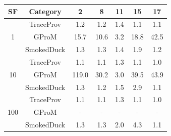 \begin{tabular}{|c|c|c|c|c|c|c|}
\hline
SF & Category & 2 & 8 & 11 & 15 & 17 \\  
 \hline 
 \multirow{3}{*}{1} & TraceProv & 1.2 & 1.2 & 1.4 & 1.1 & 1.1 \\  
 \cline{2-7} 
  & GProM & 15.7 & 10.6 & 3.2 & 18.8 & 42.5 \\  
 \cline{2-7} 
  & SmokedDuck & 1.3 & 1.3 & 1.4 & 1.9 & 1.2 \\  
 \hline 
 \multirow{3}{*}{10} & TraceProv & 1.1 & 1.1 & 1.3 & 1.1 & 1.0 \\  
 \cline{2-7} 
  & GProM & 119.0 & 30.2 & 3.0 & 39.5 & 43.9 \\  
 \cline{2-7} 
  & SmokedDuck & 1.3 & 1.2 & 1.5 & 2.9 & 1.1 \\  
 \hline 
 \multirow{3}{*}{100} & TraceProv & 1.1 & 1.1 & 1.3 & 1.1 & 1.0 \\  
 \cline{2-7} 
  & GProM & - & - & - & - & - \\  
 \cline{2-7} 
  & SmokedDuck & 1.3 & 1.3 & 2.0 & 4.3 & 1.1 \\ 
\hline
\end{tabular}